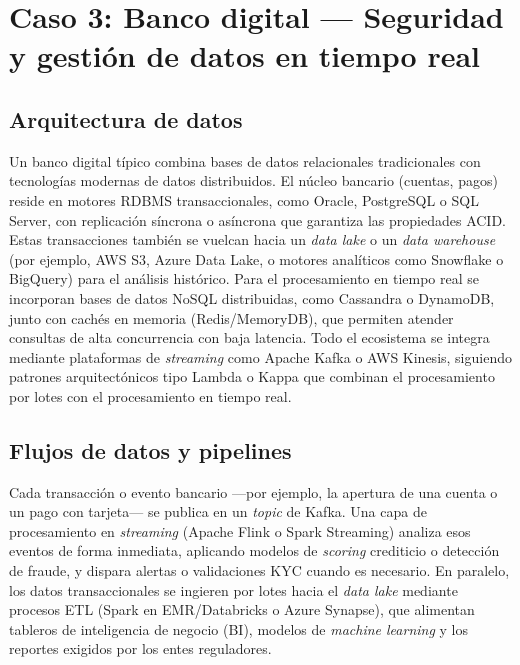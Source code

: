 \documentclass[12pt,a4paper]{article}
\begin{document}
\section{Caso 3: Banco digital --- Seguridad y gestión de datos en tiempo real}

\subsection{Arquitectura de datos}
Un banco digital típico combina bases de datos relacionales tradicionales con
tecnologías modernas de datos distribuidos. El núcleo bancario (cuentas,
pagos) reside en motores RDBMS transaccionales, como Oracle, PostgreSQL o SQL
Server, con replicación síncrona o asíncrona que garantiza las propiedades
ACID. Estas transacciones también se vuelcan hacia un \textit{data lake} o un
\textit{data warehouse} (por ejemplo, AWS S3, Azure Data Lake, o motores
analíticos como Snowflake o BigQuery) para el análisis histórico. Para el
procesamiento en tiempo real se incorporan bases de datos NoSQL distribuidas,
como Cassandra o DynamoDB, junto con cachés en memoria (Redis/MemoryDB), que
permiten atender consultas de alta concurrencia con baja latencia. Todo el
ecosistema se integra mediante plataformas de \textit{streaming} como Apache
Kafka o AWS Kinesis, siguiendo patrones arquitectónicos tipo Lambda o Kappa
que combinan el procesamiento por lotes con el procesamiento en tiempo real.

\subsection{Flujos de datos y pipelines}
Cada transacción o evento bancario —por ejemplo, la apertura de una cuenta o
un pago con tarjeta— se publica en un \textit{topic} de Kafka. Una capa de
procesamiento en \textit{streaming} (Apache Flink o Spark Streaming) analiza
esos eventos de forma inmediata, aplicando modelos de \textit{scoring}
crediticio o detección de fraude, y dispara alertas o validaciones KYC cuando
es necesario. En paralelo, los datos transaccionales se ingieren por lotes
hacia el \textit{data lake} mediante procesos ETL (Spark en EMR/Databricks o
Azure Synapse), que alimentan tableros de inteligencia de negocio (BI),
modelos de \textit{machine learning} y los reportes exigidos por los entes
reguladores.
\end{document}

